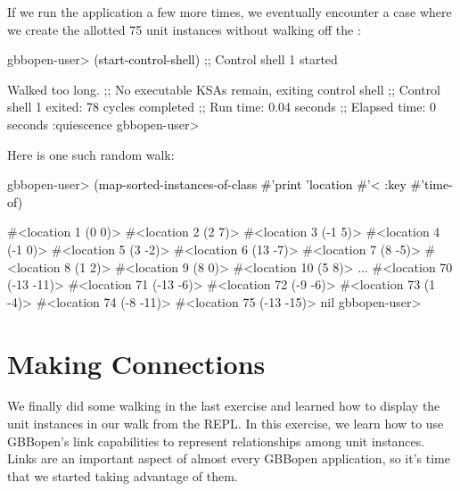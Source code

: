 \documentclass[10pt,twoside,english,pdftex]{article}
\begin{document}
%
%
If we run the application a few more times, we eventually encounter a case
where we create the allotted 75  unit instances without
walking off the :
%
\W\supp
\begin{example}
\textcolor{darkergray}{%
  gbbopen-user> \textcolor{black}{(start-control-shell)}
  ;; Control shell 1 started

  Walked too long.
  ;; No executable KSAs remain, exiting control shell
  ;; Control shell 1 exited: 78 cycles completed
  ;; Run time: 0.04 seconds
  ;; Elapsed time: 0 seconds
  :quiescence
  gbbopen-user>}
\end{example}

%
Here is one such random walk:
%
\W\supp
\begin{example}
\textcolor{darkergray}{%
  gbbopen-user> \textcolor{black}{(map-sorted-instances-of-class #'print 'location #'< 
                   :key #'time-of)}

  #<location 1 (0 0)> 
  #<location 2 (2 7)> 
  #<location 3 (-1 5)> 
  #<location 4 (-1 0)> 
  #<location 5 (3 -2)> 
  #<location 6 (13 -7)> 
  #<location 7 (8 -5)> 
  #<location 8 (1 2)> 
  #<location 9 (8 0)> 
  #<location 10 (5 8)> 
       ...
  #<location 70 (-13 -11)> 
  #<location 71 (-13 -6)> 
  #<location 72 (-9 -6)> 
  #<location 73 (1 -4)> 
  #<location 74 (-8 -11)> 
  #<location 75 (-13 -15)> 
  nil
  gbbopen-user>}
\end{example}


\T\markright{}%
\T\pagestyle{plain}
\T\cleardoublepage
\W{}
\T\pagestyle{fancy}
\T\thispagestyle{fancybottom}
\T\renewcommand{\headrulewidth}{0pt}
\section{Making Connections}
\label{sec:connections}%


We finally did some walking in the last exercise and learned how to display
the  unit instances in our walk from the REPL.  In this
exercise, we learn how to use GBBopen's link capabilities to represent
relationships among unit instances.  Links are an important aspect of almost
every GBBopen application, so it's time that we started taking advantage of
them.
\end{document}
